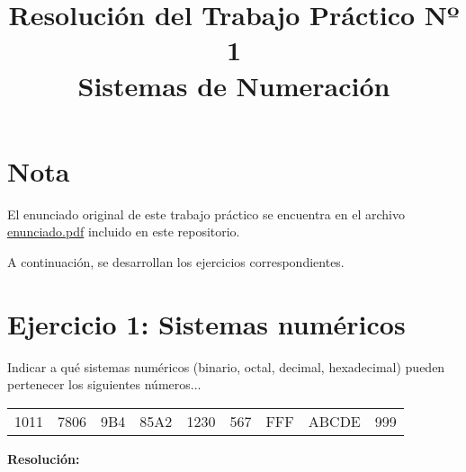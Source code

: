 \documentclass[12pt]{article}
\title{Resolución del Trabajo Práctico Nº 1\\\large Sistemas de Numeración}
\date{\date{Abril 2025}} %
\begin{document}
	
\maketitle

\section*{Nota}
El enunciado original de este trabajo práctico se encuentra en el archivo \href{./enunciado.pdf}{enunciado.pdf} incluido en este repositorio.

\vspace{0.5cm}

A continuación, se desarrollan los ejercicios correspondientes.

\section*{Ejercicio 1: Sistemas numéricos}


Indicar a qué sistemas numéricos (binario, octal, decimal, hexadecimal) pueden pertenecer los siguientes números...

\begin{center}
    \begin{tabular}{ccccccccc}
        1011 & 7806 & 9B4 & 85A2 & 1230 & 567 & FFF & ABCDE & 999 \\
    \end{tabular}
\end{center}

\textbf{Resolución:} \\
\end{document}
